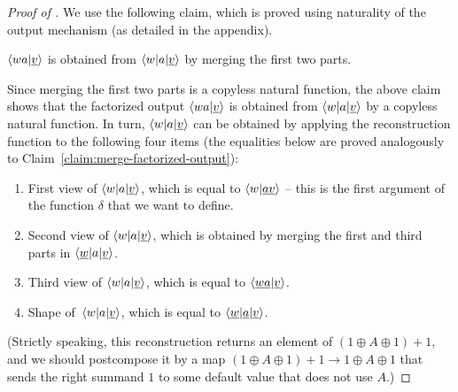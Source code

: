 \begin{proof}[Proof of ]
    We use the following claim, which is proved using naturality of the output mechanism (as detailed in the appendix).
    \begin{claim}\label{claim:merge-factorized-output}
        $\langle wa|\underline v \rangle$ is obtained from $\langle w|a|\underline v \rangle$ by merging the first two parts.
    \end{claim}

    Since merging the first two parts is a copyless natural function,  the above
    claim shows that  the factorized output $\langle wa|\underline v \rangle$ is
    obtained from $\langle w|a|\underline v \rangle$ by a copyless natural function.
    In turn, $\langle w|a|\underline v \rangle$ can be obtained by applying the reconstruction function to the following four items (the equalities below are proved analogously to Claim~\ref{claim:merge-factorized-output}):
     \begin{enumerate}
        \item \label{it:first-view}First view of $\langle w|a|\underline v \rangle$, which is equal to $\langle w|\underline {av} \rangle$ -- this is the first argument of the function $\delta$ that we want to define.
        \item  \label{it:second-view} Second view of $\langle w|a|\underline v \rangle$, which is obtained by merging the first and third parts in $\langle \underline w|a|\underline v \rangle$.
        \item \label{it:third-view}   Third view of $\langle w|a|\underline v \rangle$, which is equal to $\langle \underline {wa}|\underline{v} \rangle$.
        \item   \label{it:shape} Shape of~$\langle w|a|\underline v \rangle$, which is equal to $\langle \underline w|\underline a| \underline v \rangle$.
     \end{enumerate}
     (Strictly speaking, this reconstruction returns an element of $(1 \oplus A \oplus 1)+1$, and we should postcompose it by a map $(1 \oplus A \oplus 1)+1 \to 1 \oplus A \oplus 1$ that sends the right summand $1$ to some default value that does not use $A$.)
     

\end{proof}
